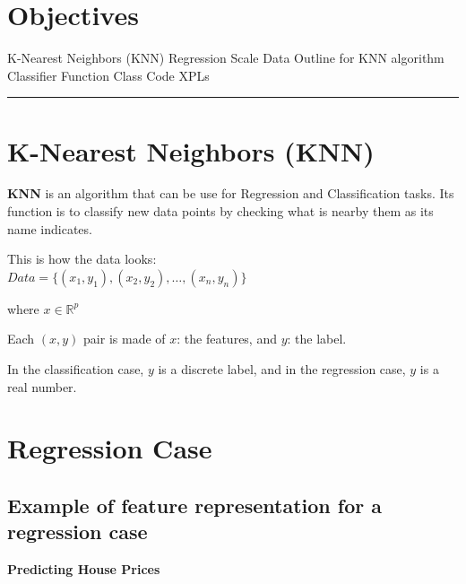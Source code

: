 \section*{Objectives}
\begin{outline}
    \1 K-Nearest Neighbors (KNN)
    \1 Regression
    \1 Scale Data
    \1 Outline for KNN algorithm
    \1 Classifier Function
    \1 Class Code
    \1 XPLs
\end{outline}

\rule[0.0051in]{\textwidth}{0.00025in}

\section{K-Nearest Neighbors (KNN)\cite{guo2003knn}}

\textbf{KNN} is an algorithm that can be use for Regression and Classification tasks. Its function is to classify new data points
by checking what is nearby them as its name indicates.

This is how the data looks:\\
$Data = \{(x_1, y_1), (x_2, y_2), \dots, (x_n, y_n)\}$

where $x \in \mathbb{R}^p$

Each $(x,y)$ pair is made of $x$: the features, and $y$: the label.

In the classification case, $y$ is a discrete label, and in the regression case, $y$ is a real number.


\section{Regression Case}

\subsection{Example of feature representation for a regression case}

\begin{center}
    \textbf{Predicting House Prices}
\end{center}

